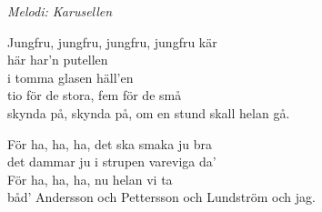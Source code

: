 {\footnotesize\textit{Melodi: Karusellen}}\par
\vspace{10pt}
Jungfru, jungfru, jungfru, jungfru kär\\
här har'n putellen\\
i tomma glasen häll'en\\
tio för de stora, fem för de små\\
skynda på, skynda på, om en stund skall helan gå.\par
\vspace{10pt}
För ha, ha, ha, det ska smaka ju bra\\
det dammar ju i strupen vareviga da'\\
För ha, ha, ha, nu helan vi ta\\
båd' Andersson och Pettersson och Lundström och jag.
